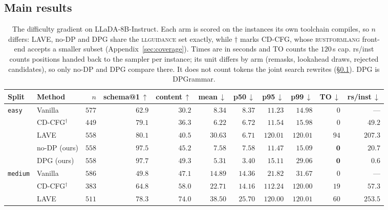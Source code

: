 \documentclass{article}
\begin{document}
\subsection{Main results}
\label{sec:results}

\begin{table}[t]
\centering
\small
\setlength{\tabcolsep}{4pt}
\caption{The difficulty gradient on LLaDA-8B-Instruct. Each arm is scored on
the instances its own toolchain compiles, so $n$ differs: LAVE, no-DP and DPG
share the \textsc{llguidance} set exactly, while $\dagger$ marks CD-CFG, whose
\textsc{rustformlang} front-end accepts a smaller subset (Appendix~\ref{sec:coverage}). Times are in
seconds and TO counts the $120$\,s cap. rs/inst counts positions handed back to
the sampler per instance; its unit differs by arm (remasks, lookahead draws,
rejected candidates), so only no-DP and DPG compare there. It does not count tokens the joint search rewrites (\S\ref{sec:results}).
DPG is DPGrammar.}
\label{tab:difficulty}
\begin{tabular}{llrrrrrrrrr}
\toprule
Split & Method & $n$ & schema@1\,$\uparrow$ & content\,$\uparrow$ & mean\,$\downarrow$ & p50\,$\downarrow$ & p95\,$\downarrow$ & p99\,$\downarrow$ & TO\,$\downarrow$ & rs/inst\,$\downarrow$ \\
\midrule
\multirow{5}{*}{\texttt{easy}}
 & Vanilla           & $577$ & $62.9$ & $30.2$ & $8.34$  & $8.37$  & $11.23$  & $14.98$  & $0$ & --- \\
 & CD-CFG$^\dagger$  & $449$ & $79.1$ & $36.3$ & $6.22$  & $6.72$  & $11.54$  & $15.98$  & $0$ & $49.2$ \\
 & LAVE              & $558$ & $80.1$ & $40.5$ & $30.63$ & $6.71$  & $120.01$ & $120.01$ & $94$ & $207.3$ \\
 & no-DP (ours)      & $558$ & $97.5$ & $45.2$ & $7.58$  & $7.58$  & $\mathbf{11.47}$ & $\mathbf{15.09}$ & $\mathbf{0}$ & $20.7$ \\
 & DPG (ours)        & $558$ & $\mathbf{97.7}$ & $\mathbf{49.3}$ & $\mathbf{5.31}$ & $\mathbf{3.40}$ & $15.11$ & $29.06$ & $\mathbf{0}$ & $\mathbf{0.6}$ \\
\midrule
\multirow{5}{*}{\texttt{medium}}
 & Vanilla           & $586$ & $49.8$ & $47.1$ & $14.89$ & $14.36$ & $21.82$  & $31.67$  & $0$ & --- \\
 & CD-CFG$^\dagger$  & $383$ & $64.8$ & $58.0$ & $22.71$ & $14.16$ & $112.24$ & $120.00$ & $19$ & $57.3$ \\
 & LAVE              & $511$ & $78.3$ & $74.0$ & $38.50$ & $25.70$ & $120.00$ & $120.01$ & $60$ & $253.5$ \\

\end{tabular}
\end{table}
\end{document}
